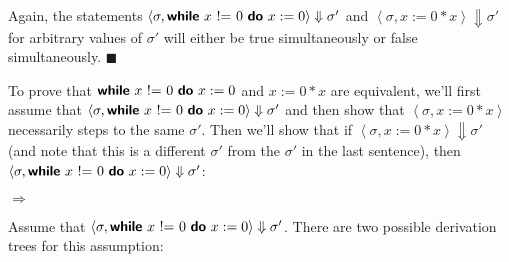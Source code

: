 \documentclass[11pt]{article}
\begin{document}
\begin{exercise}
\begin{enumerate}
\footnotesize 
\begin{prooftree}
\end{prooftree}
\normalsize

\begin{prooftree}
\end{prooftree}

Again, the statements $\left< \sigma, \while{x~\mathord{!}\mathord{=}~0}{x := 0} \right> \Downarrow \sigma'$ and $\left< \sigma, x:= 0 * x \right> \Downarrow \sigma'$ for arbitrary values of $\sigma'$ will either be true simultaneously or false simultaneously. $\blacksquare$


\newpage
\fi

To prove that $\while{x~\mathord{!}\mathord{=}~0}{x := 0}$ and $x:= 0 * x$ are equivalent, we'll first assume that $\left< \sigma, \while{x~\mathord{!}\mathord{=}~0}{x := 0} \right> \Downarrow \sigma'$ and then show that $\left< \sigma, x:=0*x \right>$ necessarily steps to the same $\sigma'$. Then we'll show that if $\left< \sigma, x:= 0 * x \right> \Downarrow \sigma'$ (and note that this is a different $\sigma'$ from the $\sigma'$ in the last sentence), then $\left< \sigma, \while{x~\mathord{!}\mathord{=}~0}{x := 0} \right> \Downarrow \sigma'$:

$\Rightarrow$

Assume that $\left<\sigma, \while{x~\mathord{!}\mathord{=}~0}{x := 0}\right> \Downarrow \sigma'$. There are two possible derivation trees for this assumption:


\end{enumerate}
\end{exercise}
\end{document}
